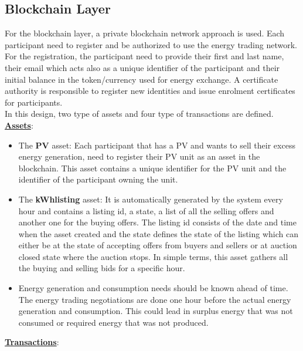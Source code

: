 \subsection{Blockchain Layer}
For the blockchain layer, a private blockchain network approach is used. Each participant need to register and be
authorized to use the energy trading network. For the registration, the participant need to provide their first
and last name, their email which acts also as a unique identifier of the participant and their initial balance in
the token/currency used for energy exchange. A certificate authority is responsible to register new identities and
issue enrolment certificates for participants.\\
In this design, two type of assets and four type of transactions are defined.\\
\textbf{\underline{Assets}}:
\begin{itemize}
    \item The \textbf{PV} asset: Each participant that has a PV and wants to sell their excess energy generation,
          need to register their PV unit as an asset in the blockchain. This asset contains a unique identifier for the
          PV unit and the identifier of the participant owning the unit.
    \item The \textbf{kWhlisting} asset: It is automatically generated by the system every hour and contains a
          listing id, a state, a list of all the selling offers and another one for the buying offers. The listing id
          consists of the date and time when the asset created and the state defines the state of the listing which can
          either be at the state of accepting offers from buyers and sellers or at auction closed state where the auction
          stops. In simple terms, this asset gathers all the buying and selling bids for a specific hour.
    \item Energy generation and consumption needs should be known ahead of time. The energy trading negotiations are
          done one hour before the actual energy generation and consumption. This could lead in surplus energy that was not
          consumed or required energy that was not produced.
\end{itemize}
\textbf{\underline{Transactions}}:
